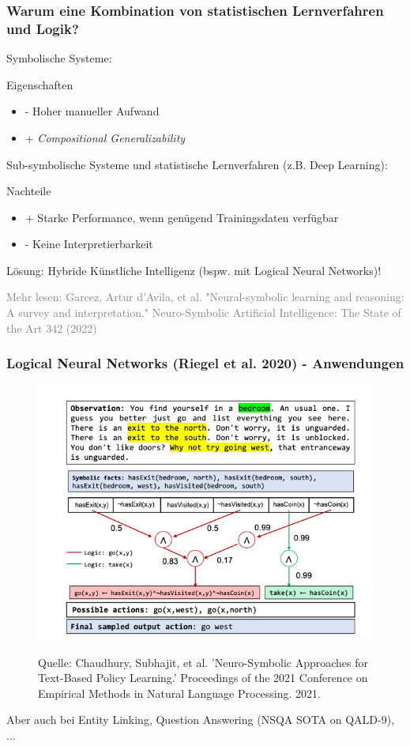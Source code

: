 \documentclass[aspectratio=169]{beamer}
\begin{document}
\begin{frame}\frametitle{Warum eine Kombination von statistischen Lernverfahren und Logik?}
Symbolische Systeme:
\begin{exampleblock}{Eigenschaften}
    \begin{itemize}
     \item - Hoher manueller Aufwand
     \item + \textit{Compositional Generalizability}
    \end{itemize}
\end{exampleblock}
Sub-symbolische Systeme und statistische Lernverfahren (z.B. Deep Learning):
\begin{exampleblock}{Nachteile}
    \begin{itemize}
        \item + Starke Performance, wenn genügend Trainingsdaten verfügbar
        \item - Keine Interpretierbarkeit
    \end{itemize}
\end{exampleblock}
Lösung: Hybride Künstliche Intelligenz (bspw. mit Logical Neural Networks)!

\vspace{3mm}
\tiny \textcolor{gray}{Mehr lesen: Garcez, Artur d’Avila, et al. "Neural-symbolic learning and reasoning: A survey and interpretation." Neuro-Symbolic Artificial Intelligence: The State of the Art 342 (2022)}
\end{frame}
 
 
\begin{frame}\frametitle{Logical Neural Networks (Riegel et al. 2020) - Anwendungen}
\begin{figure}
    \centering
    \includegraphics[width=0.5\linewidth]{Neuro-Symbolic Approaches for Text-Based Policy Learning.png}
    
    \tiny Quelle: Chaudhury, Subhajit, et al. 'Neuro-Symbolic Approaches for Text-Based Policy Learning.' Proceedings of the 2021 Conference on Empirical Methods in Natural Language Processing. 2021. 
\end{figure}

Aber auch bei Entity Linking, Question Answering (NSQA SOTA on QALD-9), ...
\end{frame}
\end{document}
